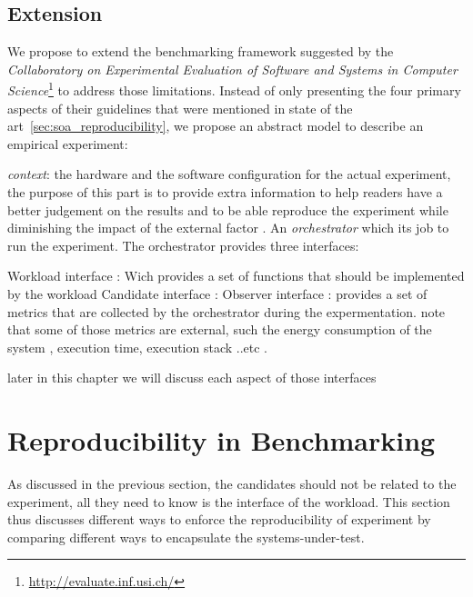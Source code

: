 \subsection{Extension}
We propose to extend the benchmarking framework suggested by the \emph{Collaboratory on Experimental Evaluation of Software and Systems in Computer Science}\footnote{\url{http://evaluate.inf.usi.ch/}} to address those limitations.
Instead of only presenting the four primary aspects of their guidelines that were mentioned in state of the art~\cref{sec:soa_reproducibility}, we propose an abstract model to describe an empirical experiment:

\emph{context}: the hardware and the software configuration for the actual experiment, the purpose of this part is to provide extra information to help readers have a better judgement on the results and to be able reproduce the experiment while diminishing the impact of the external factor . 
An \emph{orchestrator} which its job to run the experiment. 
The orchestrator provides three interfaces: 

Workload interface  : Wich provides a set of functions that should be implemented by the workload  
Candidate interface : 
Observer interface : provides a set of metrics that are collected by the orchestrator during the expermentation. note that some of those metrics are external, such the energy consumption of the system , execution time, execution stack ..etc . 




later in this chapter we will discuss each aspect of those interfaces 


\section{Reproducibility in Benchmarking}
As discussed in the previous section, the candidates should not be related to the experiment, all they need to know is the interface of the workload.
This section thus discusses different ways to enforce the reproducibility of experiment by comparing different ways to encapsulate the systems-under-test.

